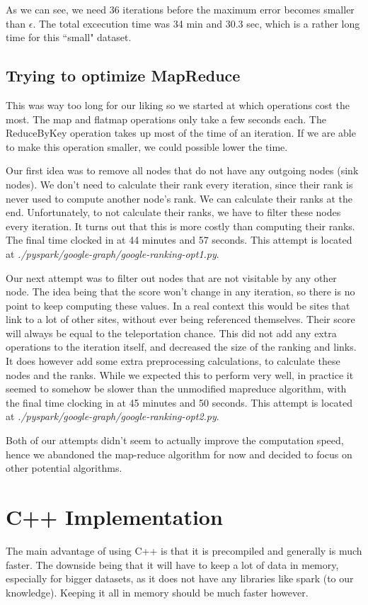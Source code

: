 \documentclass{article}
\begin{document}
As we can see, we need 36 iterations before the maximum error becomes smaller than $\epsilon$. The total excecution time was 34 min and 30.3 sec, which is a rather long time for this ``small" dataset.

\subsection{Trying to optimize MapReduce}
This was way too long for our liking so we started at which operations cost the most. The map and flatmap operations only take a few seconds each. The ReduceByKey operation takes up most of the time of an iteration. If we are able to make this operation smaller, we could possible lower the time. 

Our first idea was to remove all nodes that do not have any outgoing nodes (sink nodes). We don't need to calculate their rank every iteration, since their rank is never used to compute another node's rank. We can calculate their ranks at the end. Unfortunately, to not calculate their ranks, we have to filter these nodes every iteration. It turns out that this is more costly than computing their ranks. The final time clocked in at 44 minutes and 57 seconds. This attempt is located at \textit{./pyspark/google-graph/google-ranking-opt1.py}.

Our next attempt was to filter out nodes that are not visitable by any other node. The idea being that the score won't change in any iteration, so there is no point to keep computing these values. In a real context this would be sites that link to a lot of other sites, without ever being referenced themselves. Their score will always be equal to the teleportation chance. This did not add any extra operations to the iteration itself, and decreased the size of the ranking and links. It does however add some extra preprocessing calculations, to calculate these nodes and the ranks. While we expected this to perform very well, in practice it seemed to somehow be slower than the unmodified mapreduce algorithm, with the final time clocking in at 45 minutes and 50 seconds.
This attempt is located at \textit{./pyspark/google-graph/google-ranking-opt2.py}.

Both of our attempts didn't seem to actually improve the computation speed, hence we abandoned the map-reduce algorithm for now and decided to focus on other potential algorithms. 

\section{C++ Implementation}
The main advantage of using C++ is that it is precompiled and generally is much faster. The downside being that it will have to keep a lot of data in memory, especially for bigger datasets, as it does not have any libraries like spark (to our knowledge). Keeping it all in memory should be much faster however.
\end{document}
